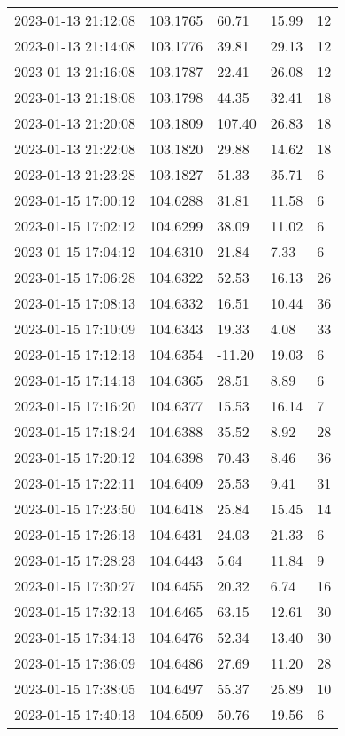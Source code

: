 \documentclass{nature_plusfigure}
\begin{document}
\begin{supplement}
\begin{center}
\begin{longtable}{lllll}
2023-01-13 21:12:08 & 103.1765 & 60.71 & 15.99 & 12 \\ 
2023-01-13 21:14:08 & 103.1776 & 39.81 & 29.13 & 12 \\ 
2023-01-13 21:16:08 & 103.1787 & 22.41 & 26.08 & 12 \\ 
2023-01-13 21:18:08 & 103.1798 & 44.35 & 32.41 & 18 \\ 
2023-01-13 21:20:08 & 103.1809 & 107.40 & 26.83 & 18 \\ 
2023-01-13 21:22:08 & 103.1820 & 29.88 & 14.62 & 18 \\ 
2023-01-13 21:23:28 & 103.1827 & 51.33 & 35.71 & 6 \\ 
2023-01-15 17:00:12 & 104.6288 & 31.81 & 11.58 & 6 \\ 
2023-01-15 17:02:12 & 104.6299 & 38.09 & 11.02 & 6 \\ 
2023-01-15 17:04:12 & 104.6310 & 21.84 & 7.33 & 6 \\ 
2023-01-15 17:06:28 & 104.6322 & 52.53 & 16.13 & 26 \\ 
2023-01-15 17:08:13 & 104.6332 & 16.51 & 10.44 & 36 \\ 
2023-01-15 17:10:09 & 104.6343 & 19.33 & 4.08 & 33 \\ 
2023-01-15 17:12:13 & 104.6354 & -11.20 & 19.03 & 6 \\ 
2023-01-15 17:14:13 & 104.6365 & 28.51 & 8.89 & 6 \\ 
2023-01-15 17:16:20 & 104.6377 & 15.53 & 16.14 & 7 \\ 
2023-01-15 17:18:24 & 104.6388 & 35.52 & 8.92 & 28 \\ 
2023-01-15 17:20:12 & 104.6398 & 70.43 & 8.46 & 36 \\ 
2023-01-15 17:22:11 & 104.6409 & 25.53 & 9.41 & 31 \\ 
2023-01-15 17:23:50 & 104.6418 & 25.84 & 15.45 & 14 \\ 
2023-01-15 17:26:13 & 104.6431 & 24.03 & 21.33 & 6 \\ 
2023-01-15 17:28:23 & 104.6443 & 5.64 & 11.84 & 9 \\ 
2023-01-15 17:30:27 & 104.6455 & 20.32 & 6.74 & 16 \\ 
2023-01-15 17:32:13 & 104.6465 & 63.15 & 12.61 & 30 \\ 
2023-01-15 17:34:13 & 104.6476 & 52.34 & 13.40 & 30 \\ 
2023-01-15 17:36:09 & 104.6486 & 27.69 & 11.20 & 28 \\ 
2023-01-15 17:38:05 & 104.6497 & 55.37 & 25.89 & 10 \\ 
2023-01-15 17:40:13 & 104.6509 & 50.76 & 19.56 & 6 \\ 

\end{longtable}
\end{center}
\end{supplement}
\end{document}
